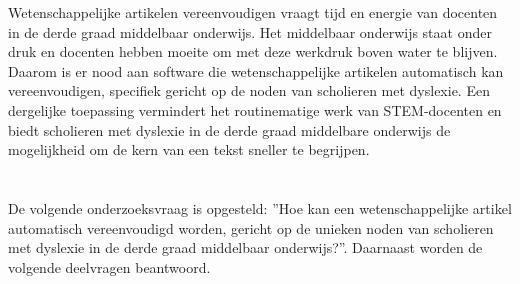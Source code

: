 \newline

Wetenschappelijke artikelen vereenvoudigen vraagt tijd en energie van docenten in de derde graad middelbaar onderwijs. Het middelbaar onderwijs staat onder druk en docenten hebben moeite om met deze werkdruk boven water te blijven. Daarom is er nood aan software die wetenschappelijke artikelen automatisch kan vereenvoudigen, specifiek gericht op de noden van scholieren met dyslexie. Een dergelijke toepassing vermindert het routinematige werk van STEM-docenten en biedt scholieren met dyslexie in de derde graad middelbare onderwijs de mogelijkheid om de kern van een tekst sneller te begrijpen.

\section{}%
\label{sec:onderzoeksvraag}



De volgende onderzoeksvraag is opgesteld: ”Hoe kan een wetenschappelijke artikel automatisch vereenvoudigd worden, gericht op de unieken noden van scholieren met dyslexie in de derde graad middelbaar onderwijs?”. Daarnaast worden de volgende deelvragen beantwoord.


